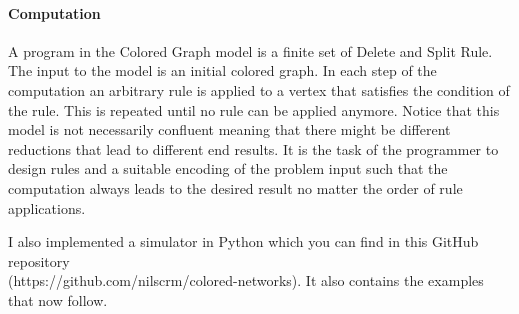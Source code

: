 \paragraph*{Computation}
A program in the Colored Graph model is a finite set of Delete and Split Rule.
The input to the model is an initial colored graph.
In each step of the computation an arbitrary rule is applied to a vertex that satisfies the condition of the rule.
This is repeated until no rule can be applied anymore.
Notice that this model is not necessarily confluent meaning that there might be different reductions that lead to different end results.
It is the task of the programmer to design rules and a suitable encoding of the problem input such that the computation always leads to the desired result no matter the order of rule applications.

I also implemented a simulator in Python which you can find in this GitHub repository \\
(https://github.com/nilscrm/colored-networks).
It also contains the examples that now follow.